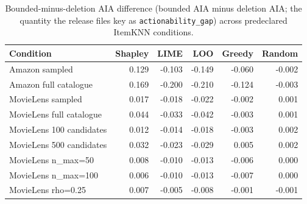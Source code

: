 \begin{table}[t]\centering\scriptsize
\caption{Bounded-minus-deletion AIA difference (bounded AIA minus deletion AIA; the quantity the release files key as \texttt{actionability\_gap}) across predeclared ItemKNN conditions.}
\label{tab:appC4}
\begin{tabular}{lrrrrr}
\toprule
Condition & Shapley & LIME & LOO & Greedy & Random \\
\midrule
Amazon sampled & 0.129 & -0.103 & -0.149 & -0.060 & -0.002 \\
Amazon full catalogue & 0.169 & -0.200 & -0.210 & -0.124 & -0.003 \\
MovieLens sampled & 0.017 & -0.018 & -0.022 & -0.002 & 0.001 \\
MovieLens full catalogue & 0.044 & -0.033 & -0.042 & -0.003 & 0.001 \\
MovieLens 100 candidates & 0.012 & -0.014 & -0.018 & -0.003 & 0.002 \\
MovieLens 500 candidates & 0.032 & -0.023 & -0.029 & 0.005 & 0.002 \\
MovieLens n_max=50 & 0.008 & -0.010 & -0.013 & -0.006 & 0.000 \\
MovieLens n_max=100 & 0.006 & -0.010 & -0.013 & -0.007 & 0.000 \\
MovieLens rho=0.25 & 0.007 & -0.005 & -0.008 & -0.001 & -0.001 \\
\bottomrule
\end{tabular}
\end{table}
